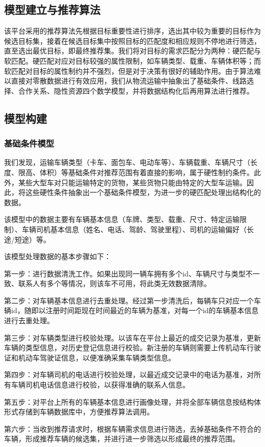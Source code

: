 \documentclass[UTF8]{ctexart}
\begin{document}
\begin{multicols}{2}
\section{模型建立与推荐算法}
该平台采用的推荐算法先根据目标重要性进行排序，选出其中较为重要的目标作为候选目标集，接着在候选目标集中按照目标的匹配度和相应规则不停地进行筛选，直至选出最优目标，即最终推荐集。我们将对目标的需求匹配分为两种：硬匹配与软匹配。硬匹配对应对目标较强的属性限制，如车辆类型、载重、车辆体积等；而软匹配对目标的属性制约并不强烈，但是对于决策有很好的辅助作用。由于算法难以直接对零散数据进行有效应用，我们从物流运输中抽象出了基础条件、线路选择、合作关系、隐性资源四个数学模型，并将数据结构化后再用算法进行推荐。
\subsection{模型构建}
\subsubsection{基础条件模型}
我们发现，运输车辆类型（卡车、面包车、电动车等）、车辆载重、车辆尺寸（长度、限高、体积）等基础条件对推荐范围有着直接的影响，属于硬性制约条件。此外，某些大型车对只能运输特定的货物，某些货物只能由特定的大型车运输。因此，将这些硬性条件抽象出一个基础条件模型，为进一步的硬匹配处理出结构化的数据。

该模型中的数据主要有车辆基本信息（车牌、类型、载重、尺寸、特定运输限制）、车辆司机基本信息（姓名、电话、驾龄、驾驶里程）、司机的运输偏好（长途/短途）等。

该模型处理数据的基本步骤如下：

第一步：进行数据清洗工作。如果出现同一辆车拥有多个id、车辆尺寸与类型不一致、联系人有多个等情况，则该车不可用，将此类无效数据清除。

第二步：对车辆基本信息进行去重处理。经过第一步清洗后，每辆车只对应一个车辆id，随即以注册时间距现在时间最近的车辆为基准，对每一个id的车辆基本信息进行去重处理。

第三步：对车辆类型进行校验处理。以该车在平台上最近的成交记录为基准，更新车辆的类型信息，对历史登记信息进行校验。新注册的车辆则需要上传机动车行驶证和机动车驾驶证信息，以便准确采集车辆类型信息。

第四步：对车辆司机的电话进行校验处理，以最近成交记录中的电话为基准，对所有车辆司机电话信息进行校验，以获得准确的联系人信息。

第五步：对平台上所有的车辆基本信息进行画像处理，并将全部车辆信息按结构体形式存储到车辆数据库中，方便推荐算法调用。

第六步：当收到推荐请求时，根据车辆需求信息进行筛选，去掉基础条件不符合的车辆，形成推荐车辆的候选集，并进行进一步筛选以形成最终的推荐范围。

\end{multicols}
\end{document}
